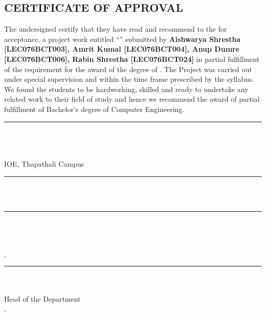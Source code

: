 \begin{spacing}{1.5}
\chapter*{CERTIFICATE OF APPROVAL}
\vspace{6pt}
The undersigned certify that they have read and recommend to the \textbf{\thedepartment} for acceptance, a project work entitled “\textbf{\thetitle}” submitted by \textbf{Aishwarya Shrestha [LEC076BCT003], Amrit Kumal [LEC076BCT004], Anup Dumre [LEC076BCT006], Rabin Shrestha [LEC076BCT024]} in partial fulfillment of the requirement for the award of the degree of \theDegree. The Project was carried out under special supervision and within the time frame prescribed by the syllabus.\\
We found the students to be hardworking, skilled and ready to undertake any related 
work to their field of study and hence we recommend the award of partial fulfillment 
of Bachelor’s degree of Computer Engineering.

\vspace{10pt}
\rule{0.5\textwidth}{0.4pt}\\
\\
\thesupervisor\\
IOE, Thapathali Campus

\vspace{6pt}
\rule{0.5\textwidth}{0.4pt}\\
\\

\vspace{6pt}
\rule{0.5\textwidth}{0.4pt}\\
\\
\theprojectcoordinator\\
\thedepartment, \thecampus

\vspace{6pt}
\rule{0.5\textwidth}{0.4pt}\\
\text{\theHOD}\\
Head of the Department\\
\thedepartment, \thecampus

\thedate
\end{spacing}
